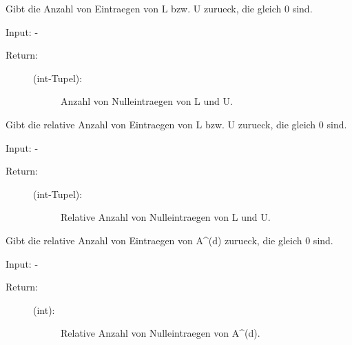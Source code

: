 \documentclass[letterpaper,10pt,ngerman]{sphinxmanual}
\begin{document}
\begin{fulllineitems}
\begin{fulllineitems}
\label{\detokenize{index:sparse_erw.Sparse.anz_n_lu_abs}}
Gibt die Anzahl von Eintraegen von L bzw. U zurueck, die gleich 0 sind.

Input: -
\begin{description}
\item[{Return:}] \leavevmode\begin{description}
\item[{(int-Tupel):}] \leavevmode
Anzahl von Nulleintraegen von L und U.

\end{description}

\end{description}

\end{fulllineitems}


\begin{fulllineitems}
\label{\detokenize{index:sparse_erw.Sparse.anz_n_lu_rel}}
Gibt die relative Anzahl von Eintraegen von L bzw. U zurueck, die gleich 0 sind.

Input: -
\begin{description}
\item[{Return:}] \leavevmode\begin{description}
\item[{(int-Tupel):}] \leavevmode
Relative Anzahl von Nulleintraegen von L und U.

\end{description}

\end{description}

\end{fulllineitems}


\begin{fulllineitems}
\label{\detokenize{index:sparse_erw.Sparse.anz_n_rel}}
Gibt die relative Anzahl von Eintraegen von A\textasciicircum{}(d) zurueck, die gleich 0 sind.

Input: -
\begin{description}
\item[{Return:}] \leavevmode\begin{description}
\item[{(int):}] \leavevmode
Relative Anzahl von Nulleintraegen von A\textasciicircum{}(d).


\end{description}
\end{description}
\end{fulllineitems}
\end{fulllineitems}
\end{document}
